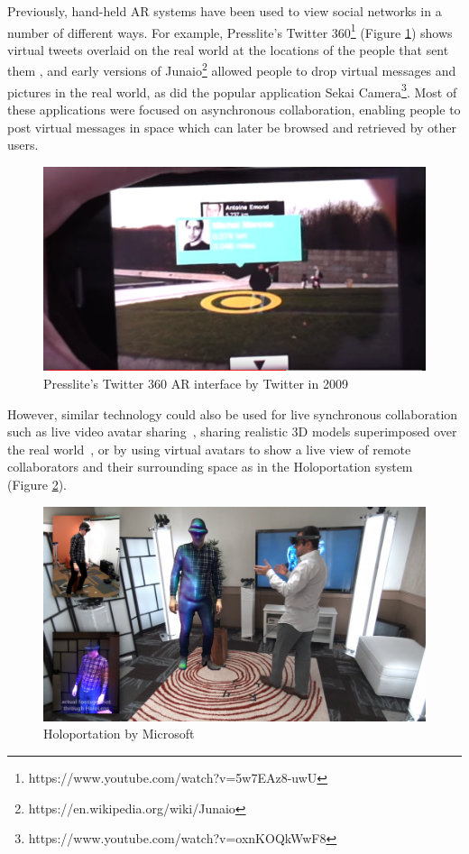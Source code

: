 Previously, hand-held AR systems have been used to view social networks in a number of different ways. For example, Presslite's Twitter 360\footnote{https://www.youtube.com/watch?v=5w7EAz8-uwU} (Figure \ref{fig:presslite}) shows virtual tweets overlaid on the real world at the locations of the people that sent them , and early versions of Junaio\footnote{https://en.wikipedia.org/wiki/Junaio} allowed people to drop virtual messages and pictures in the real world, as did the popular application Sekai Camera\footnote{https://www.youtube.com/watch?v=oxnKOQkWwF8}. Most of these applications were focused on asynchronous collaboration, enabling people to post virtual messages in space which can later be browsed and retrieved by other users. 

\begin{figure}
    \centering
    \includegraphics[width=.8\linewidth]{images/Presslite-twitter-360.PNG}
    \caption{Presslite's Twitter 360 AR interface by Twitter in 2009}
    \label{fig:presslite}
\end{figure}

However, similar technology could also be used for live synchronous collaboration such as live video avatar sharing~\cite{Billinghurst2002}, sharing realistic 3D models superimposed over the real world~\cite{Fanello2016}, or by using virtual avatars to show a live view of remote collaborators and their surrounding space as in the Holoportation system~\cite{Fanello2016} (Figure \ref{fig:holoportation}).

\begin{figure}
    \centering
    \includegraphics[width=.8\linewidth]{images/holoportation.png}
    \caption{Holoportation by Microsoft \cite{Fanello2016}}
    \label{fig:holoportation}
\end{figure}

